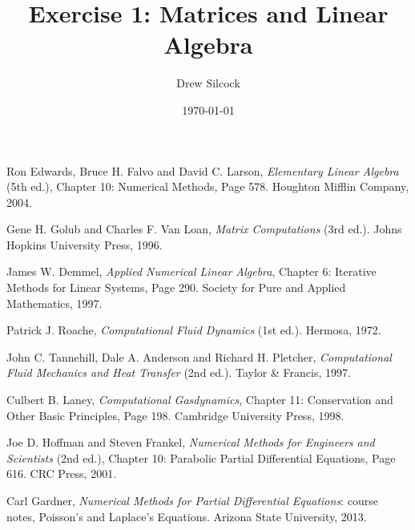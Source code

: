 \documentclass[aps,twocolumn,nobalancelastpage]{revtex4}
\begin{document}
\title{Exercise 1: Matrices and Linear Algebra}
\author{Drew Silcock}
\date{\today}

\maketitle







\begin{thebibliography}{99}

        Ron Edwards, Bruce H. Falvo and David C. Larson,
        \emph{Elementary Linear Algebra} (5th ed.),
        Chapter 10: Numerical Methods,
        Page 578.
        Houghton Mifflin Company,
        2004.

        Gene H. Golub and Charles F. Van Loan,
        \emph{Matrix Computations} (3rd ed.).
        Johns Hopkins University Press,
        1996.

        James W. Demmel,
        \emph{Applied Numerical Linear Algebra},
        Chapter 6: Iterative Methods for Linear Systems,
        Page 290.
        Society for Pure and Applied Mathematics,
        1997.

        Patrick J. Roache,
        \emph{Computational Fluid Dynamics} (1st ed.).
        Hermosa,
        1972.

        John C. Tannehill, Dale A. Anderson and Richard H. Pletcher,
        \emph{Computational Fluid Mechanics and Heat Transfer} (2nd ed.).
        Taylor \& Francis,
        1997.

        Culbert B. Laney,
        \emph{Computational Gasdynamics},
        Chapter 11: Conservation and Other Basic Principles,
        Page 198.
        Cambridge University Press,
        1998.

        Joe D. Hoffman and Steven Frankel,
        \emph{Numerical Methods for Engineers and Scientists} (2nd ed.),
        Chapter 10: Parabolic Partial Differential Equations,
        Page 616.
        CRC Press,
        2001.

        Carl Gardner,
        \emph{Numerical Methods for Partial Differential Equations}: course notes,
        Poisson's and Laplace's Equations.
        Arizona State University,
        2013.

\end{thebibliography}
\end{document}
